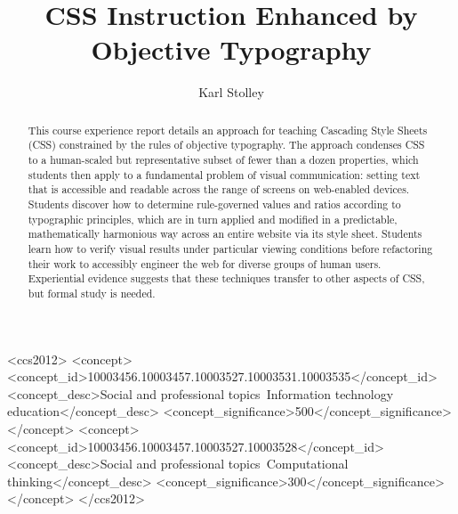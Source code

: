 \documentclass[sigconf,sigplan,review,anonymous]{acmart}
\begin{document}
\title[Objective Typography]{CSS Instruction Enhanced by Objective Typography}

\author{Karl Stolley}

\begin{abstract}
This course experience report details an approach for teaching Cascading Style Sheets (CSS) constrained by the rules of objective typography. The approach condenses CSS to a human-scaled but representative subset of fewer than a dozen properties, which students then apply to a fundamental problem of visual communication: setting text that is accessible and readable across the range of screens on web-enabled devices. Students discover how to determine rule-governed values and ratios according to typographic principles, which are in turn applied and modified in a predictable, mathematically harmonious way across an entire website via its style sheet. Students learn how to verify visual results under particular viewing conditions before refactoring their work to accessibly engineer the web for diverse groups of human users. Experiential evidence suggests that these techniques transfer to other aspects of CSS, but formal study is needed.
\end{abstract}

\begin{CCSXML}
<ccs2012>
<concept>
<concept_id>10003456.10003457.10003527.10003531.10003535</concept_id>
<concept_desc>Social and professional topics~Information technology education</concept_desc>
<concept_significance>500</concept_significance>
</concept>
<concept>
<concept_id>10003456.10003457.10003527.10003528</concept_id>
<concept_desc>Social and professional topics~Computational thinking</concept_desc>
<concept_significance>300</concept_significance>
</concept>
</ccs2012>
\end{CCSXML}




\maketitle
\end{document}
